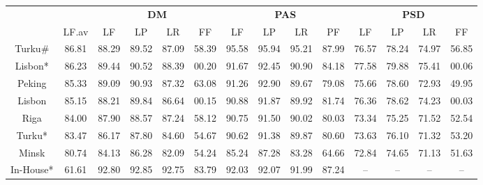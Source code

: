 \begin{table}
    \centering
    \smaller[]
    \smaller[]
    \smaller[0.5]
    \begin{tabular}{@{}cccccccccccccc@{}}
        \toprule
        \multicolumn{1}{c}{ }
        & \multicolumn{1}{c}{ }
        & \multicolumn{4}{c}{\textbf{DM}}
        & \multicolumn{4}{c}{\textbf{PAS}}
        & \multicolumn{4}{c}{\textbf{PSD}} \\
        \cmidrule(lr){3-6}
        \cmidrule(lr){7-10}
        \cmidrule(lr){11-14}
        &
        LF.av &
        LF & LP & LR & FF &
        LF & LP & LR & PF &
        LF & LP & LR & FF \\
        \midrule
        Turku\# & 86.81 & 88.29 & 89.52 & 87.09 & 58.39 & 95.58 & 95.94 & 95.21 & 87.99 & 76.57 & 78.24 & 74.97 & 56.85 \\
        Lisbon* & 86.23 & 89.44 & 90.52 & 88.39 & 00.20 & 91.67 & 92.45 & 90.90 & 84.18 & 77.58 & 79.88 & 75.41 & 00.06 \\
        Peking & 85.33 & 89.09 & 90.93 & 87.32 & 63.08 & 91.26 & 92.90 & 89.67 & 79.08 & 75.66 & 78.60 & 72.93 & 49.95 \\
        Lisbon & 85.15 & 88.21 & 89.84 & 86.64 & 00.15 & 90.88 & 91.87 & 89.92 & 81.74 & 76.36 & 78.62 & 74.23 & 00.03 \\
        Riga & 84.00 & 87.90 & 88.57 & 87.24 & 58.12 & 90.75 & 91.50 & 90.02 & 80.03 & 73.34 & 75.25 & 71.52 & 52.54 \\
        Turku* & 83.47 & 86.17 & 87.80 & 84.60 & 54.67 & 90.62 & 91.38 & 89.87 & 80.60 & 73.63 & 76.10 & 71.32 & 53.20 \\
        Minsk & 80.74 & 84.13 & 86.28 & 82.09 & 54.24 & 85.24 & 87.28 & 83.28 & 64.66 & 72.84 & 74.65 & 71.13 & 51.63 \\
        In-House* & 61.61 & 92.80 & 92.85 & 92.75 & 83.79 & 92.03 & 92.07 & 91.99 & 87.24 & – & – & – & – \\
        \bottomrule
        

\end{tabular}
\end{table}
